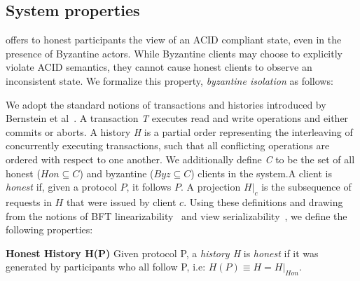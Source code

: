 \subsection{System properties}
\sys{} offers to honest participants the view of an ACID compliant state, even in the presence of Byzantine actors. While Byzantine clients may choose to explicitly violate ACID semantics, they cannot cause honest clients to observe an inconsistent state. We formalize this property, \textit{byzantine isolation} as follows: 



We adopt the standard notions of transactions and histories introduced by Bernstein et al~\cite{bernstein1987concurrency}. A transaction \textit{T} executes read and write operations and either commits or aborts. A history \textit{H} is a partial order representing the interleaving of concurrently executing transactions, such that all conflicting operations are ordered with respect to one another. We additionally define \textit{C} to be the set of all honest ($Hon \subseteq C$) and byzantine ($Byz \subseteq C$) clients in the system.A client is \textit{honest} if, given a protocol $P$, it follows $P$. A projection $H|_{c}$ is the subsequence of requests in $H$ that were issued by client $c$. Using these definitions and drawing from the notions of BFT linearizability~\cite{liskov2006tolerating} and view serializability~\cite{bernstein1987concurrency}, we define the following properties:

\par\textbf{Honest History H(P)} Given protocol P, a \textit{history H} is \textit{honest} if it was generated by participants who all follow P, i.e: $H(P) \equiv H = H|_{Hon}$.

